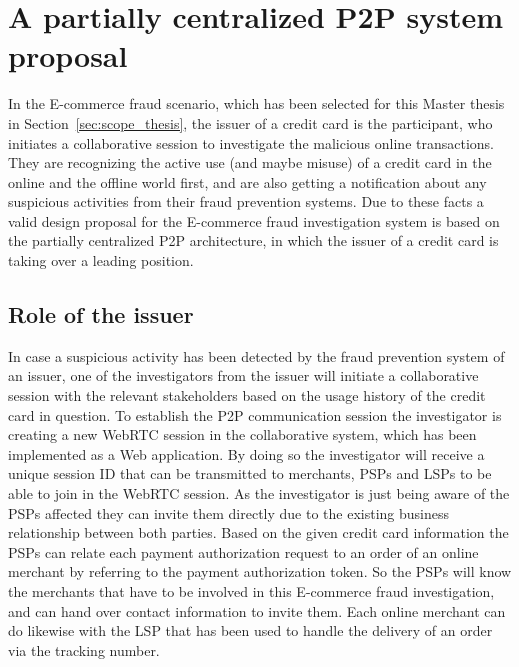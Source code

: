
\section{A partially centralized \gls{P2P} system proposal}
\label{sec:p2p_partially_centralized_system}

In the \gls{E-commerce} fraud scenario, which has been selected for this Master thesis in Section~\ref{sec:scope_thesis}, the issuer of a credit card is the participant, who initiates a collaborative session to investigate the malicious online transactions. They are recognizing the active use (and maybe misuse) of a credit card in the online and the offline world first, and are also getting a notification about any suspicious activities from their fraud prevention systems. Due to these facts a valid design proposal for the \gls{E-commerce} fraud investigation system is based on the partially centralized \gls{P2P} architecture, in which the issuer of a credit card is taking over a leading position.

\subsection{Role of the issuer}
\label{subsec:p2p_partially_issuer_collecting}

In case a suspicious activity has been detected by the fraud prevention system of an issuer, one of the investigators from the issuer will initiate a collaborative session with the relevant stakeholders based on the usage history of the credit card in question. To establish the \gls{P2P} communication session the investigator is creating a new \gls{WebRTC} session in the collaborative system, which has been implemented as a Web application. By doing so the investigator will receive a unique session ID that can be transmitted to merchants, \gls{PSP}s and \gls{LSP}s to be able to join in the \gls{WebRTC} session. As the investigator is just being aware of the \gls{PSP}s affected they can invite them directly due to the existing business relationship between both parties. Based on the given credit card information the \gls{PSP}s can relate each payment authorization request to an order of an online merchant by referring to the payment authorization token. So the \gls{PSP}s will know the merchants that have to be involved in this \gls{E-commerce} fraud investigation, and can hand over contact information to invite them. Each online merchant can do likewise with the \gls{LSP} that has been used to handle the delivery of an order via the tracking number. \\

